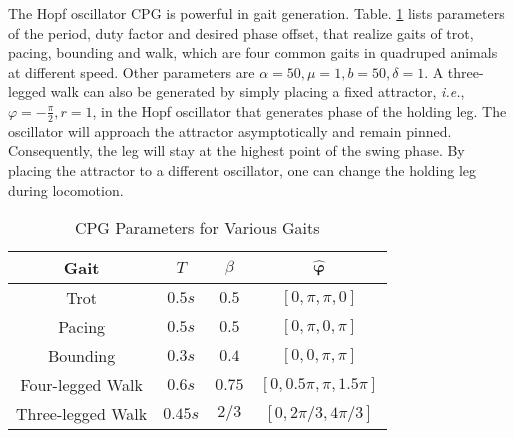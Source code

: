 \documentclass[letterpaper, 10 pt, journal, twoside]{IEEEtran} %
\begin{document}
The Hopf oscillator CPG is powerful in gait generation. Table. \ref{method_table_1} lists parameters of the period, duty factor and desired phase offset, that realize gaits of trot, pacing, bounding and walk, which are four common gaits in quadruped animals at different speed\cite{Xi2016,Zhang2018}. Other parameters are $\alpha=50,\mu=1,b=50,\delta=1$. A three-legged walk can also be generated by simply placing a fixed attractor, \textit{i.e.}, $\varphi=-\frac{\pi}{2},r=1$, in the Hopf oscillator that generates phase of the holding leg. The oscillator will approach the attractor asymptotically and remain pinned. Consequently, the leg will stay at the highest point of the swing phase. By placing the attractor to a different oscillator, one can change the holding leg during locomotion.
\begin{table}[!t]
	\renewcommand{\arraystretch}{1.3}
	\caption{CPG Parameters for Various Gaits}
	\label{method_table_1}
	\centering
	\begin{tabular}{|c|c|c|c|}
		\hline
		Gait & $T$ & $\beta$ & $\boldsymbol{\hat{\varphi}}$\\
		\hline
		Trot & $0.5s$ & $0.5$ & $\left[0, \pi, \pi, 0\right]$\\
		\hline
		Pacing & $0.5s$ & $0.5$ & $\left[0, \pi, 0, \pi\right]$\\
		\hline
		Bounding & $0.3s$ & $0.4$ & $\left[0, 0, \pi, \pi\right]$\\
		\hline
		Four-legged Walk & $0.6s$ & $0.75$ & $\left[0, 0.5\pi, \pi, 1.5\pi\right]$\\
		\hline
		Three-legged Walk & $0.45s$ & $2/3$ & $\left[0, 2\pi/3, 4\pi/3\right]$\\
		\hline
	\end{tabular}
\end{table}
\end{document}
